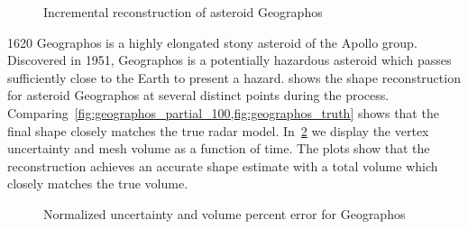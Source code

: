 \documentclass[journal]{new-aiaa}
\begin{document}
\begin{figure}[htbp]
    \caption[Asteroid Geographos incremental reconstruction]{Incremental reconstruction of asteroid Geographos~\label{fig:geographos_reconstruction}}
\end{figure}

\num{1620} Geographos is a highly elongated stony asteroid of the Apollo group.
Discovered in \num{1951}, Geographos is a potentially hazardous asteroid which passes sufficiently close to the Earth to present a hazard.
 shows the shape reconstruction for asteroid Geographos at several distinct points during the process.
Comparing~\cref{fig:geographos_partial_100,fig:geographos_truth} shows that the final shape closely matches the true radar model.
In~\cref{fig:geographos_metrics} we display the vertex uncertainty and mesh volume as a function of time.
The plots show that the reconstruction achieves an accurate shape estimate with a total volume which closely matches the true volume.

\begin{figure}[htbp]
    \centering
    
    \caption{Normalized uncertainty and volume percent error for Geographos\label{fig:geographos_metrics}}
\end{figure}
\end{document}
